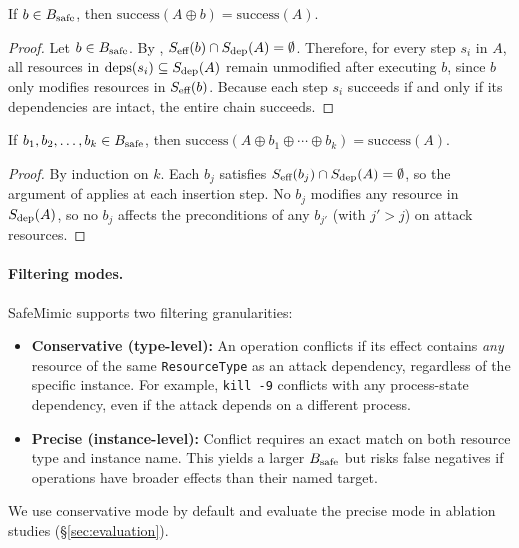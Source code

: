 \begin{theorem}
\label{thm:static_safety}
If\/ $b \in B_{\text{safe}}$, then $\mathrm{success}(A \oplus b) = \mathrm{success}(A)$.
\end{theorem}

\begin{proof}
Let $b \in B_{\text{safe}}$. By ,
$S_{\text{eff}}(b) \cap S_{\text{dep}}(A) = \emptyset$. Therefore, for every step
$s_i$ in $A$, all resources in $\mathrm{deps}(s_i) \subseteq S_{\text{dep}}(A)$
remain unmodified after executing $b$, since $b$ only modifies resources
in $S_{\text{eff}}(b)$. Because each step $s_i$ succeeds if and only if its
dependencies are intact, the entire chain succeeds.
\end{proof}

\begin{corollary}[Composability]
\label{cor:composability}
If\/ $b_1, b_2, \ldots, b_k \in B_{\text{safe}}$, then
$\mathrm{success}(A \oplus b_1 \oplus \cdots \oplus b_k) = \mathrm{success}(A)$.
\end{corollary}

\begin{proof}
By induction on $k$. Each $b_j$ satisfies
$S_{\text{eff}}(b_j) \cap S_{\text{dep}}(A) = \emptyset$, so the argument of
 applies at each insertion step. No $b_j$
modifies any resource in $S_{\text{dep}}(A)$, so no $b_j$ affects the
preconditions of any $b_{j'}$ (with $j' > j$) on attack resources.
\end{proof}

\paragraph{Filtering modes.}
SafeMimic supports two filtering granularities:
\begin{itemize}
  \item \textbf{Conservative (type-level):} An operation conflicts if its
        effect contains \emph{any} resource of the same \texttt{ResourceType}
        as an attack dependency, regardless of the specific instance. For
        example, \texttt{kill -9} conflicts with any
        process-state dependency, even if the attack depends on a different process.
  \item \textbf{Precise (instance-level):} Conflict requires an exact
        match on both resource type and instance name. This yields a
        larger $B_{\text{safe}}$ but risks false negatives if operations have
        broader effects than their named target.
\end{itemize}
We use conservative mode by default and evaluate the precise mode in
ablation studies (\S\ref{sec:evaluation}).

